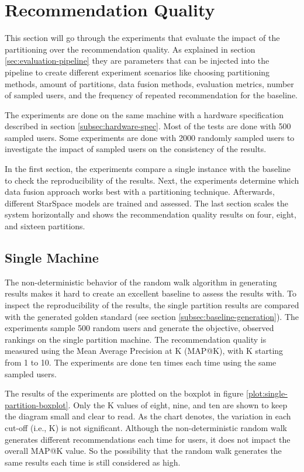 \section{Recommendation Quality}
\label{sec:recommendation-quality}
This section will go through the experiments that evaluate the impact of the partitioning over the recommendation quality. As explained in section \ref{sec:evaluation-pipeline} they are parameters that can be injected into the pipeline to create different experiment scenarios like choosing partitioning methods, amount of partitions, data fusion methods, evaluation metrics, number of sampled users, and the frequency of repeated recommendation for the baseline.


The experiments are done on the same machine with a hardware specification described in section \ref{subsec:hardware-spec}. Most of the tests are done with 500 sampled users. Some experiments are done with 2000 randomly sampled users to investigate the impact of sampled users on the consistency of the results.


In the first section, the experiments compare a single instance with the baseline to check the reproducibility of the results. Next, the experiments determine which data fusion approach works best with a partitioning technique. Afterwards, different StarSpace models are trained and assessed. The last section scales the system horizontally and shows the recommendation quality results on four, eight, and sixteen partitions. 


\subsection{Single Machine}
\label{subsec:eval-single-machine}
The non-deterministic behavior of the random walk algorithm in generating results makes it hard to create an excellent baseline to assess the results with. To inspect the reproducibility of the results, the single partition results are compared with the generated golden standard (see section \ref{subsec:baseline-generation}). The experiments sample 500 random users and generate the objective, observed rankings on the single partition machine. The recommendation quality is measured using the Mean Average Precision at K (MAP@K), with K starting from 1 to 10. The experiments are done ten times each time using the same sampled users. 

The results of the experiments are plotted on the boxplot in figure \ref{plot:single-partition-boxplot}. Only the K values of eight, nine, and ten are shown to keep the diagram small and clear to read. As the chart denotes, the variation in each cut-off (i.e., K) is not significant. Although the non-deterministic random walk generates different recommendations each time for users, it does not impact the overall MAP@K value. So the possibility that the random walk generates the same results each time is still considered as high.


